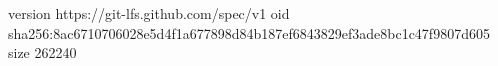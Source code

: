 version https://git-lfs.github.com/spec/v1
oid sha256:8ac6710706028e5d4f1a677898d84b187ef6843829ef3ade8bc1c47f9807d605
size 262240
